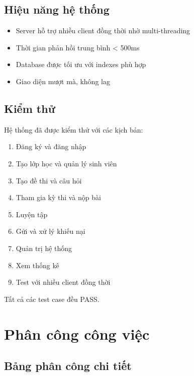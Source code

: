 \documentclass[12pt,a4paper]{report}
\begin{document}
\section{Hiệu năng hệ thống}

\begin{itemize}
    \item Server hỗ trợ nhiều client đồng thời nhờ multi-threading
    \item Thời gian phản hồi trung bình < 500ms
    \item Database được tối ưu với indexes phù hợp
    \item Giao diện mượt mà, không lag
\end{itemize}

\section{Kiểm thử}

Hệ thống đã được kiểm thử với các kịch bản:

\begin{enumerate}
    \item Đăng ký và đăng nhập
    \item Tạo lớp học và quản lý sinh viên
    \item Tạo đề thi và câu hỏi
    \item Tham gia kỳ thi và nộp bài
    \item Luyện tập
    \item Gửi và xử lý khiếu nại
    \item Quản trị hệ thống
    \item Xem thống kê
    \item Test với nhiều client đồng thời
\end{enumerate}

Tất cả các test case đều PASS.

\chapter{Phân công công việc}

\section{Bảng phân công chi tiết}
\end{document}

